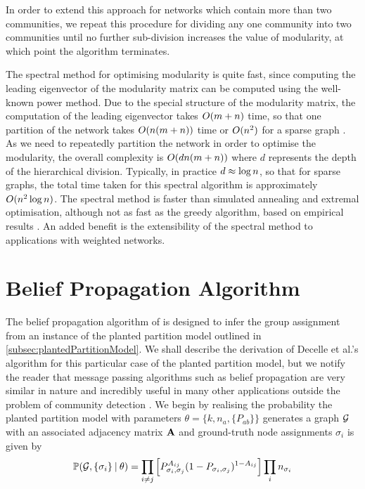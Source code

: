 In order to extend this approach for networks which contain more than two communities, we repeat this procedure for dividing any one community into two communities until no further sub-division increases the value of modularity, at which point the algorithm terminates.

The spectral method for optimising modularity is quite fast, since computing the leading eigenvector of the modularity matrix can be computed using the well-known power method.
Due to the special structure of the modularity matrix, the computation of the leading eigenvector takes $O(m+n)$ time, so that one partition of the network takes $O(n(m+n))$ time or $O(n^{2})$ for a sparse graph \cite{For10}.
As we need to repeatedly partition the network in order to optimise the modularity, the overall complexity is $O(dn(m+n))$ where $d$ represents the depth of the hierarchical division.
Typically, in practice $d \approx \log n$, so that for sparse graphs, the total time taken for this spectral algorithm is approximately $O(n^{2}\log n)$.
The spectral method is faster than simulated annealing and extremal optimisation, although not as fast as the greedy algorithm, based on empirical results \cite{For10}.
An added benefit is the extensibility of the spectral method to applications with weighted networks.


\section{Belief Propagation Algorithm}
\label{sec:beliefPropagationAlgorithm}

The belief propagation algorithm of \cite{Has06,DKM+13} is designed to infer the group assignment from an instance of the planted partition model outlined in \cref{subsec:plantedPartitionModel}.
We shall describe the derivation of Decelle et al.'s algorithm \cite{DKM+13} for this particular case of the planted partition model, but we notify the reader that message passing algorithms such as belief propagation are very similar in nature and incredibly useful in many other applications outside the problem of community detection \cite{For10}.
We begin by realising the probability the planted partition model with parameters $\theta = \{k,n_{a},\{P_{ab}\}\}$ generates a graph $\mathcal G$ with an associated adjacency matrix $\mathbf A$ and ground-truth node assignments ${\sigma_{i}}$ is given by
\begin{equation}
	\label{eq:probabilityPPMGeneratingGraph}
	\mathbb{P}(\mathcal G,\{\sigma_{i}\} \:\lvert\: \theta) = \prod_{i \neq j} \left[ P_{\sigma_{i},\sigma_{j}}^{A_{ij}} (1-P_{\sigma_{i},\sigma_{j}})^{1-A_{ij}} \right] \prod_{i} n_{\sigma_{i}}
\end{equation}


